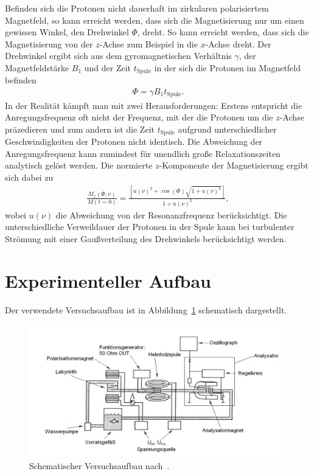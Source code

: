 \documentclass[paper=a4,
	fontsize=10pt,
	DIV=18,
	twocolumn,
	parskip=half
	]{scrartcl}
\numberwithin{equation}{section}    %
\begin{document}
Befinden sich die Protonen nicht dauerhaft im zirkularen polarisiertem Magnetfeld, so kann erreicht werden, dass sich die Magnetisierung nur um einen gewissen Winkel, den Drehwinkel $\Phi$, dreht. So kann erreicht werden, dass sich die Magnetisierung von der $z$-Achse zum Beispiel in die $x$-Achse dreht. Der Drehwinkel ergibt sich aus dem gyromagnetischen Verhältnis $\gamma$, der Magnetfeldstärke $B_1$ und der Zeit $t_\mathrm{Spule}$ in der sich die Protonen im Magnetfeld befinden
\begin{align}
	\Phi=\gamma B_1 t_\mathrm{Spule}.
\end{align}
In der Realität kämpft man mit zwei Herausforderungen: Erstens entspricht die Anregungsfrequenz oft nicht der Frequenz, mit der die Protonen um die $z$-Achse präzedieren und zum andern ist die Zeit $t_\mathrm{Spule}$ aufgrund unterschiedlicher Geschwindigkeiten der Protonen nicht identisch. Die Abweichung der Anregungsfrequenz kann zumindest für unendlich große Relaxationszeiten analytisch gelöst werden. Die normierte $z$-Komponente der Magnetisierung ergibt sich dabei zu
\begin{align}
	\frac{M_z(\Phi, \nu)}{M(t=0)}=\frac{\left[ u(\nu)^2+\cos(\Phi)\sqrt{1+u(\nu)^2} \right]}{1+u(\nu)^2},
\end{align}
wobei $u(\nu)$ die Abweichung von der Resonanzfrequenz berücksichtigt.
Die unterschiedliche Verweildauer der Protonen in der Spule kann bei turbulenter Strömung mit einer Gaußverteilung des Drehwinkels berücksichtigt werden. 
%
\section{Experimenteller Aufbau}
\label{Experiment}
%
Der verwendete Versuchsaufbau ist in Abbildung~\ref{fig.versuchsaufbau} schematisch dargestellt.

\begin{figure}[htp]
	\begin{center}
		\includegraphics[width=\columnwidth]{Bilder/nmr_aufbau}
		\caption{Schematischer Versuchsaufbau nach~\citet{anleitung}.}
		\label{fig.versuchsaufbau}
	\end{center}
\end{figure}
\end{document}
